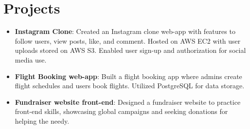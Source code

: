 \documentclass[a4paper,11pt]{article}
\newcommand{\resumeItem}[2]{
  \item\small{
    \textbf{#1}{: #2 \vspace{-2pt}}
  }
}
\newcommand{\resumeSubItem}[2]{\resumeItem{#1}{#2}\vspace{-4pt}}
\newcommand{\resumeSubHeadingListStart}{\begin{itemize}[leftmargin=*]}
\newcommand{\resumeSubHeadingListEnd}{\end{itemize}}
\begin{document}
\section{Projects}
  \resumeSubHeadingListStart
    \resumeSubItem{Instagram Clone}
      {Created an Instagram clone web-app with features to follow users, view posts, like, and comment. Hosted on AWS EC2 with user uploads stored on AWS S3. Enabled user sign-up and authorization for social media use.}
    \resumeSubItem{Flight Booking web-app}
      {Built a flight booking app where admins create flight schedules and users book flights. Utilized PostgreSQL for data storage.}
    \resumeSubItem{Fundraiser website front-end}
      {Designed a fundraiser website to practice front-end skills, showcasing global campaigns and seeking donations for helping the needy.}
  \resumeSubHeadingListEnd
\end{document}
